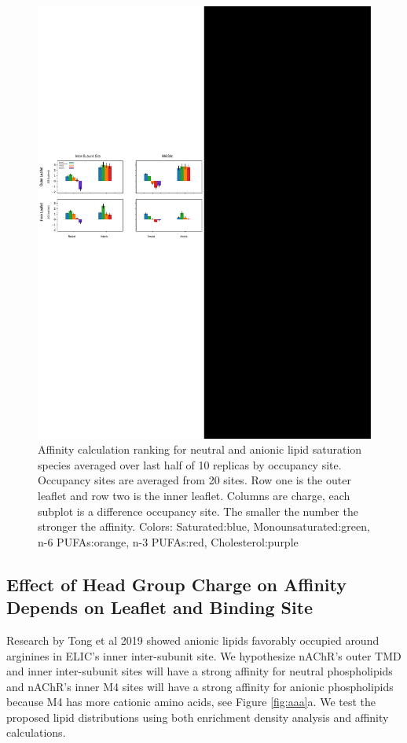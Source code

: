 \documentclass[preprint,3p,9pt,times,onecolumn]{elsarticle}
\newcommand{\nachr}{nAChR}
\begin{document}
\begin{figure}[!h]
	\center
	\includegraphics[width=\linewidth]{Lipid_centric.pdf}
	\caption{Affinity calculation ranking for neutral and anionic lipid saturation species averaged over last half of 10 replicas by occupancy site. Occupancy sites are averaged from 20 sites. Row one is the outer leaflet and row two is the inner leaflet. Columns are charge, each subplot is a difference occupancy site. The smaller the number the stronger the affinity. Colors: Saturated:blue, Monounsaturated:green, n-6 PUFAs:orange, n-3 PUFAs:red, Cholesterol:purple}
	\label{fig:lipidBar}
\end{figure}

\subsection{Effect of Head Group Charge on Affinity Depends on Leaflet and Binding Site}

Research by Tong et al 2019 \cite{Tong2019} showed anionic lipids favorably occupied around arginines in ELIC's inner inter-subunit site. We hypothesize \nachr's outer TMD and inner inter-subunit sites will have a strong affinity for neutral phospholipids and \nachr's inner M4 sites will have a strong affinity for anionic phospholipids because M4 has more cationic amino acids, see Figure \ref{fig:aaa}a. We test the proposed lipid distributions using both enrichment density analysis and affinity calculations.
\end{document}

